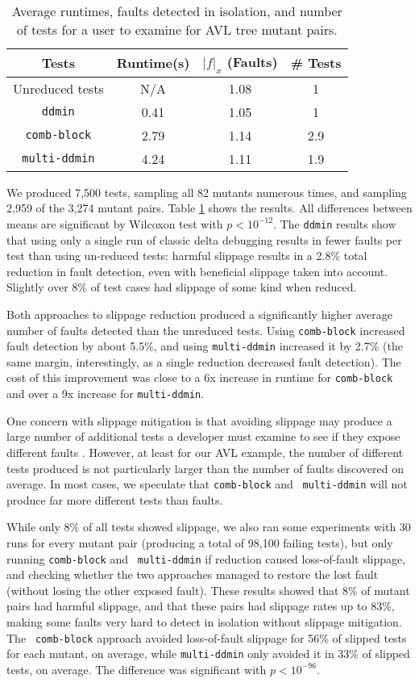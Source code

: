 \begin{table}
\centering
{\scriptsize
\begin{tabular}{|c|c|c|c|}
\hline
Tests & Runtime(s) & $|f|_x$ (Faults) & \# Tests\\
\hline
\hline
Unreduced tests & N/A & 1.08 & 1 \\
\hline
{\tt ddmin} & 0.41 & 1.05 & 1 \\
\hline
{\tt comb-block} & 2.79 & 1.14 & 2.9 \\
\hline
{\tt multi-ddmin} & 4.24 & 1.11 & 1.9 \\
\hline
\end{tabular}
}
\caption{Average runtimes, faults detected in isolation, and number of
  tests for a user to examine for AVL
  tree mutant pairs.}
\label{tab1}
\end{table}

We produced 7,500 tests, sampling all 82 mutants numerous times, and
sampling 2,959 of the 3,274 mutant pairs.  Table \ref{tab1} shows the
results.  All differences between means are significant by Wilcoxon
test with $p < 10^{-12}$.  The {\tt ddmin} results show that using
only a single run of classic delta debugging results in fewer faults
per test than using un-reduced tests:  harmful slippage
results in a 2.8\% total reduction in fault detection, even with
beneficial slippage taken into account.  Slightly over 8\% of test
cases had slippage of some kind when reduced.  

Both  approaches to slippage reduction produced a significantly higher
average number of faults detected than the unreduced tests.
Using {\tt comb-block} increased fault detection by about 5.5\%, and
using {\tt multi-ddmin} increased it by 2.7\% (the same margin,
interestingly, as a single reduction decreased fault detection).  The
cost of this improvement was close to a 6x increase in runtime
for {\tt comb-block} and over a 9x increase for {\tt multi-ddmin}.

One concern with slippage mitigation is that avoiding slippage may
produce a large number of additional tests a developer must examine to
see if they expose different faults \cite{PLDI13}.  However, at least
for our AVL example, the number of different tests produced is not
particularly larger than the number of faults discovered on average.
In most cases, we speculate that {\tt comb-block} and {\tt
  multi-ddmin} will not produce far more different tests than faults.

While only 8\% of all
tests showed slippage, we also ran some experiments with 30 runs for
every mutant pair (producing a total of 98,100 failing tests), but only running {\tt comb-block} and {\tt
  multi-ddmin} if reduction caused  loss-of-fault slippage, and
checking whether the two approaches managed to restore the lost fault
(without losing the other exposed fault).  These
results showed that 8\% of mutant pairs had harmful slippage, and that these
pairs had slippage rates up to 83\%, making some faults very
hard to detect in isolation without slippage mitigation.  The {\tt
  comb-block} approach avoided loss-of-fault slippage for 56\% of
slipped tests for each mutant, on average, while {\tt multi-ddmin}
only avoided it in 33\% of slipped tests, on average.  The difference
was significant with $p < 10^{-96}$.

